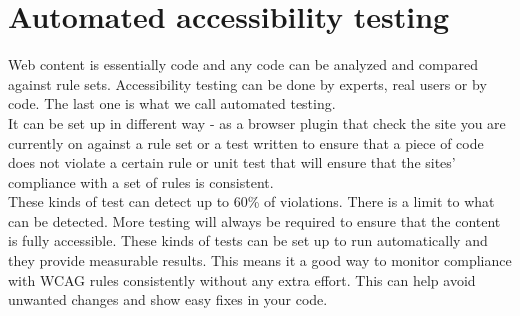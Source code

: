 \documentclass{master_thesis_section}
\begin{document}
\section{Automated accessibility testing}

Web content is essentially code and any code can be analyzed and compared against rule sets. Accessibility testing can be done by experts, real users or by code. The last one is what we call automated testing. \\
It can be set up in different way - as a browser plugin that check the site you are currently on against a rule set or a test written to ensure that a piece of code does not violate a certain rule or unit test that will ensure that the sites' compliance with a set of rules is consistent. \\
These kinds of test can detect up to 60\% of violations. There is a limit to what can be detected. More testing will always be required to ensure that the content is fully accessible. These kinds of tests can be set up to run automatically and they provide measurable results. This means it a good way to monitor compliance with WCAG rules consistently without any extra effort. This can help avoid unwanted changes and show easy fixes in  your code.
\end{document}
